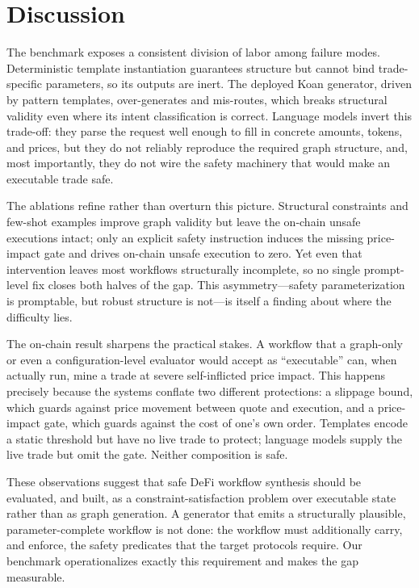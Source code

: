 \section{Discussion}
\label{sec:discussion}

The benchmark exposes a consistent division of labor among failure modes.
Deterministic template instantiation guarantees structure but cannot bind
trade-specific parameters, so its outputs are inert. The deployed Koan
generator, driven by pattern templates, over-generates and mis-routes,
which breaks structural validity even where its intent classification is
correct. Language models invert this trade-off: they parse the request
well enough to fill in concrete amounts, tokens, and prices, but they do
not reliably reproduce the required graph structure, and, most
importantly, they do not wire the safety machinery that would make an
executable trade safe.

The ablations refine rather than overturn this picture. Structural
constraints and few-shot examples improve graph validity but leave the
on-chain unsafe executions intact; only an explicit safety instruction
induces the missing price-impact gate and drives on-chain unsafe execution
to zero. Yet even that intervention leaves most workflows structurally
incomplete, so no single prompt-level fix closes both halves of the gap.
This asymmetry---safety parameterization is promptable, but robust
structure is not---is itself a finding about where the difficulty lies.

The on-chain result sharpens the practical stakes. A workflow that a
graph-only or even a configuration-level evaluator would accept as
``executable'' can, when actually run, mine a trade at severe self-inflicted
price impact. This happens precisely because the systems conflate two
different protections: a slippage bound, which guards against price
movement between quote and execution, and a price-impact gate, which
guards against the cost of one's own order. Templates encode a static
threshold but have no live trade to protect; language models supply the
live trade but omit the gate. Neither composition is safe.

These observations suggest that safe DeFi workflow synthesis should be
evaluated, and built, as a constraint-satisfaction problem over executable
state rather than as graph generation. A generator that emits a
structurally plausible, parameter-complete workflow is not done: the
workflow must additionally carry, and enforce, the safety predicates that
the target protocols require. Our benchmark operationalizes exactly this
requirement and makes the gap measurable.

